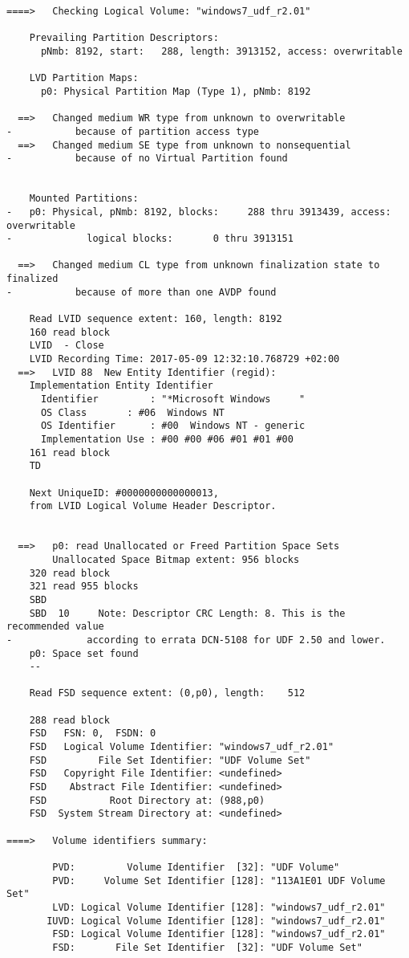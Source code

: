 \begin{lstlisting}
====>   Checking Logical Volume: "windows7_udf_r2.01"

    Prevailing Partition Descriptors:
      pNmb: 8192, start:   288, length: 3913152, access: overwritable

    LVD Partition Maps:
      p0: Physical Partition Map (Type 1), pNmb: 8192

  ==>   Changed medium WR type from unknown to overwritable
-           because of partition access type
  ==>   Changed medium SE type from unknown to nonsequential
-           because of no Virtual Partition found


    Mounted Partitions:
-   p0: Physical, pNmb: 8192, blocks:     288 thru 3913439, access: overwritable
-             logical blocks:       0 thru 3913151

  ==>   Changed medium CL type from unknown finalization state to finalized
-           because of more than one AVDP found

    Read LVID sequence extent: 160, length: 8192
    160 read block
    LVID  - Close
    LVID Recording Time: 2017-05-09 12:32:10.768729 +02:00
  ==>   LVID 88  New Entity Identifier (regid):
    Implementation Entity Identifier
      Identifier         : "*Microsoft Windows     "
      OS Class       : #06  Windows NT
      OS Identifier      : #00  Windows NT - generic
      Implementation Use : #00 #00 #06 #01 #01 #00
    161 read block
    TD  

    Next UniqueID: #0000000000000013,
    from LVID Logical Volume Header Descriptor.


  ==>   p0: read Unallocated or Freed Partition Space Sets
        Unallocated Space Bitmap extent: 956 blocks
    320 read block
    321 read 955 blocks
    SBD 
    SBD  10     Note: Descriptor CRC Length: 8. This is the recommended value
-             according to errata DCN-5108 for UDF 2.50 and lower.
    p0: Space set found
    --

    Read FSD sequence extent: (0,p0), length:    512

    288 read block
    FSD   FSN: 0,  FSDN: 0
    FSD   Logical Volume Identifier: "windows7_udf_r2.01"
    FSD         File Set Identifier: "UDF Volume Set"
    FSD   Copyright File Identifier: <undefined>
    FSD    Abstract File Identifier: <undefined>
    FSD           Root Directory at: (988,p0)
    FSD  System Stream Directory at: <undefined>

====>   Volume identifiers summary:

        PVD:         Volume Identifier  [32]: "UDF Volume"
        PVD:     Volume Set Identifier [128]: "113A1E01 UDF Volume Set"
        LVD: Logical Volume Identifier [128]: "windows7_udf_r2.01"
       IUVD: Logical Volume Identifier [128]: "windows7_udf_r2.01"
        FSD: Logical Volume Identifier [128]: "windows7_udf_r2.01"
        FSD:       File Set Identifier  [32]: "UDF Volume Set"


\end{lstlisting}
